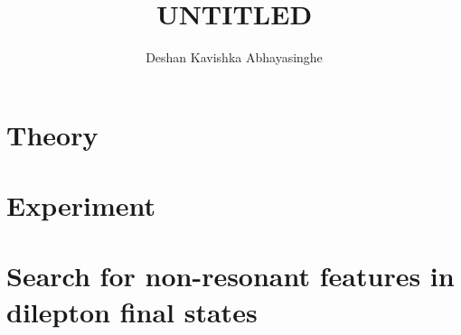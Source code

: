 \documentclass[11pt,a4paper,hyperpdf,oneside,nobind]{AJBthesis}
\title{\texorpdfstring{UNTITLED}{UNTITLED}}
\author{Deshan Kavishka Abhayasinghe}
\begin{document}
\begin{frontmatter}
    
\end{frontmatter}

\begin{mainmatter}
    \linenumbers
    \part{Theory}
    
    
    \part{Experiment}
    
    
    \part{Search for non-resonant features in dilepton final states}
    
    
    
    
    
    
    
\end{mainmatter}

\clearpage

\begin{backmatter}
     
     
        
\end{backmatter}

\let\svaddcontentsline\addcontentsline
    \renewcommand\addcontentsline[3]{%
        \edef\qtest{#1}%
        \def\qmatch{lof}%
        \ifx\qmatch\qtest\else%
            \def\qmatch{lot}%
            \ifx\qmatch\qtest\else%
                \svaddcontentsline{#1}{#2}{#3}%
        \fi\fi%
    }

\begin{appendices}
\end{appendices}
\end{document}
